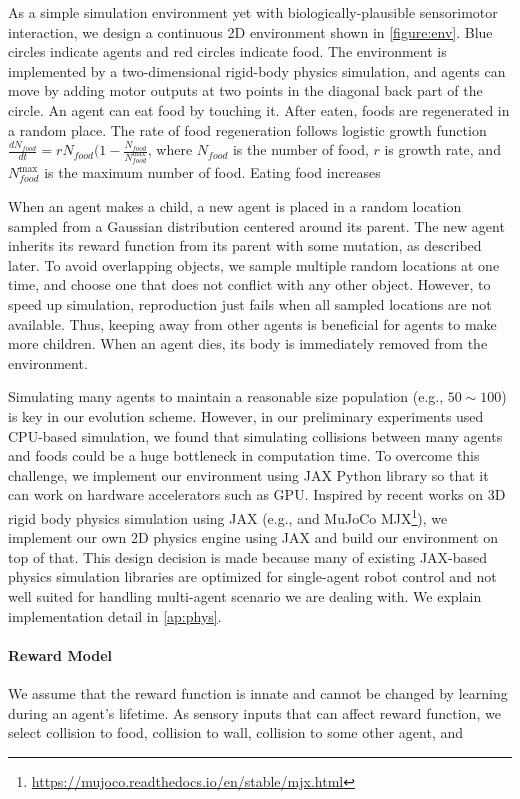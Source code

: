 As a simple simulation environment yet with biologically-plausible sensorimotor interaction, we design a continuous 2D environment shown in \cref{figure:env}. Blue circles indicate agents and red circles indicate food. The environment is implemented by a two-dimensional rigid-body physics simulation, and agents can move by adding motor outputs at two points in the diagonal back part of the circle. An agent can eat food by touching it. After eaten, foods are regenerated in a random place. The rate of food regeneration follows logistic growth function $\frac{dN_{food}}{dt} = r N_{food} (1 - \frac{N_{food}}{N_{food}^{\mathrm{max}}}$, where $N_{food}$ is the number of food, $r$ is growth rate, and $N_{food}^{\mathrm{max}}$ is the maximum number of food. Eating food increases

When an agent makes a child, a new agent is placed in a random location sampled from a Gaussian distribution centered around its parent. The new agent inherits its reward function from its parent with some mutation, as described later. To avoid overlapping objects, we sample multiple random locations at one time, and choose one that does not conflict with any other object. However, to speed up simulation, reproduction just fails when all sampled locations are not available. Thus, keeping away from other agents is beneficial for agents to make more children. When an agent dies, its body is immediately removed from the environment.

Simulating many agents to maintain a reasonable size population (e.g., $50\sim 100$) is key in our evolution scheme. However, in our preliminary experiments used CPU-based simulation, we found that simulating collisions between many agents and foods could be a huge bottleneck in computation time. To overcome this challenge, we implement our environment using JAX Python library \citep{jax2018github} so that it can work on hardware accelerators such as GPU. Inspired by recent works on 3D rigid body physics simulation using JAX (e.g., \citet{brax2021github} and MuJoCo \citep{todorov2012mujoco} MJX\footnote{\url{https://mujoco.readthedocs.io/en/stable/mjx.html}}), we implement our own 2D physics engine using JAX and build our environment on top of that. This design decision is made because many of existing JAX-based physics simulation libraries are optimized for single-agent robot control and not well suited for handling multi-agent scenario we are dealing with. We explain implementation detail in \cref{ap:phys}.

\paragraph{Reward Model}
We assume that the reward function is innate and cannot be changed by learning during an agent's lifetime. As sensory inputs that can affect reward function, we select  collision to food,  collision to wall,  collision to some other agent, and 


